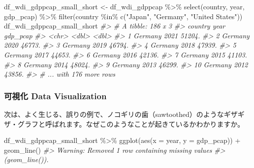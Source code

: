 \documentclass[
]{bxjsbook}
\newenvironment{Shaded}{\begin{snugshade}}{\end{snugshade}}
\newcommand{\AttributeTok}[1]{\textcolor[rgb]{0.77,0.63,0.00}{#1}}
\newcommand{\CommentTok}[1]{\textcolor[rgb]{0.56,0.35,0.01}{\textit{#1}}}
\newcommand{\FunctionTok}[1]{\textcolor[rgb]{0.00,0.00,0.00}{#1}}
\newcommand{\NormalTok}[1]{#1}
\newcommand{\OtherTok}[1]{\textcolor[rgb]{0.56,0.35,0.01}{#1}}
\newcommand{\SpecialCharTok}[1]{\textcolor[rgb]{0.00,0.00,0.00}{#1}}
\newcommand{\StringTok}[1]{\textcolor[rgb]{0.31,0.60,0.02}{#1}}
\theoremstyle{definition}
\theoremstyle{definition}
\theoremstyle{definition}
\theoremstyle{definition}
\theoremstyle{remark}
\begin{document}
\begin{Shaded}
\begin{Highlighting}[]
\NormalTok{df\_wdi\_gdppcap\_small\_short }\OtherTok{\textless{}{-}}\NormalTok{ df\_wdi\_gdppcap }\SpecialCharTok{\%\textgreater{}\%} \FunctionTok{select}\NormalTok{(country, year, gdp\_pcap) }\SpecialCharTok{\%\textgreater{}\%}
  \FunctionTok{filter}\NormalTok{(country }\SpecialCharTok{\%in\%} \FunctionTok{c}\NormalTok{(}\StringTok{"Japan"}\NormalTok{, }\StringTok{"Germany"}\NormalTok{, }\StringTok{"United States"}\NormalTok{))}
\NormalTok{df\_wdi\_gdppcap\_small\_short}
\CommentTok{\#\textgreater{} \# A tibble: 186 x 3}
\CommentTok{\#\textgreater{}    country  year gdp\_pcap}
\CommentTok{\#\textgreater{}    \textless{}chr\textgreater{}   \textless{}dbl\textgreater{}    \textless{}dbl\textgreater{}}
\CommentTok{\#\textgreater{}  1 Germany  2021   51204.}
\CommentTok{\#\textgreater{}  2 Germany  2020   46773.}
\CommentTok{\#\textgreater{}  3 Germany  2019   46794.}
\CommentTok{\#\textgreater{}  4 Germany  2018   47939.}
\CommentTok{\#\textgreater{}  5 Germany  2017   44653.}
\CommentTok{\#\textgreater{}  6 Germany  2016   42136.}
\CommentTok{\#\textgreater{}  7 Germany  2015   41103.}
\CommentTok{\#\textgreater{}  8 Germany  2014   48024.}
\CommentTok{\#\textgreater{}  9 Germany  2013   46299.}
\CommentTok{\#\textgreater{} 10 Germany  2012   43856.}
\CommentTok{\#\textgreater{} \# ... with 176 more rows}
\end{Highlighting}
\end{Shaded}

\hypertarget{ux53efux8996ux5316-data-visualization}{%
\subsubsection{可視化 Data Visualization}\label{ux53efux8996ux5316-data-visualization}}

次は、よく生じる、誤りの例で、ノコギリの歯（sawtoothed）のようなギザギザ・グラフと呼ばれます。なぜこのようなことが起きているかわかりますか。

\begin{Shaded}
\begin{Highlighting}[]
\NormalTok{df\_wdi\_gdppcap\_small\_short }\SpecialCharTok{\%\textgreater{}\%}
  \FunctionTok{ggplot}\NormalTok{(}\FunctionTok{aes}\NormalTok{(}\AttributeTok{x =}\NormalTok{ year, }\AttributeTok{y =}\NormalTok{ gdp\_pcap)) }\SpecialCharTok{+} \FunctionTok{geom\_line}\NormalTok{()}
\CommentTok{\#\textgreater{} Warning: Removed 1 row containing missing values}
\CommentTok{\#\textgreater{} (\textasciigrave{}geom\_line()\textasciigrave{}).}
\end{Highlighting}
\end{Shaded}
\end{document}
